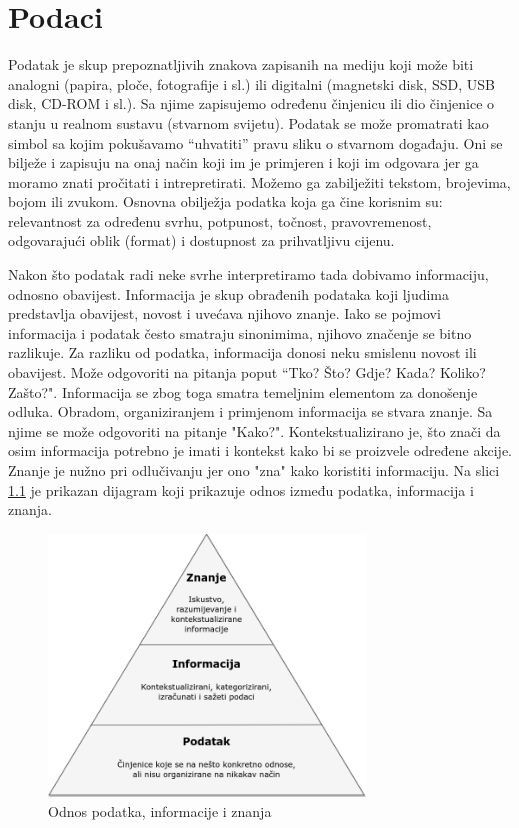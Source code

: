\documentclass{foi}
\begin{document}
\chapter{Podaci}

Podatak je skup prepoznatljivih znakova zapisanih na mediju koji može biti analogni (papira, ploče, fotografije i sl.)  ili digitalni (magnetski disk, SSD, USB disk, CD-ROM i sl.). Sa njime zapisujemo određenu činjenicu ili dio činjenice o stanju u realnom sustavu (stvarnom svijetu). Podatak se može promatrati kao simbol sa kojim pokušavamo “uhvatiti” pravu sliku o stvarnom događaju. Oni se bilježe i zapisuju na onaj način koji im je primjeren i koji im odgovara jer ga moramo znati pročitati i intrepretirati. Možemo ga zabilježiti tekstom, brojevima, bojom ili zvukom. Osnovna obilježja podatka koja ga čine korisnim su: relevantnost za određenu svrhu, potpunost, točnost, pravovremenost, odgovarajući oblik (format) i dostupnost za prihvatljivu cijenu. 

Nakon što podatak radi neke svrhe interpretiramo tada dobivamo informaciju, odnosno obavijest. Informacija je skup obrađenih podataka koji ljudima predstavlja obavijest, novost i uvećava njihovo znanje. Iako se pojmovi informacija i podatak često smatraju sinonimima, njihovo značenje se bitno razlikuje. Za razliku od podatka, informacija donosi neku smislenu novost ili obavijest. Može odgovoriti na pitanja poput “Tko? Što? Gdje? Kada? Koliko? Zašto?". Informacija se zbog toga smatra temeljnim elementom za donošenje odluka. Obradom, organiziranjem i primjenom informacija se stvara znanje. Sa njime se može odgovoriti na pitanje "Kako?". Kontekstualizirano je, što znači da osim informacija potrebno je imati i kontekst kako bi se proizvele određene akcije. Znanje je nužno pri odlučivanju jer ono "zna" kako koristiti informaciju. \cite{poslovnoRacunarstvo} Na slici \ref{znanjeinfopodatak} je prikazan dijagram koji prikazuje odnos između podatka, informacija i znanja.

\begin{figure}[h!]
    \centering
    \includegraphics[width=0.75\textwidth]{slike/znanjeinfopodatak.png}
    \caption{Odnos podatka, informacije i znanja \cite{diwdiagram}}
    \label{znanjeinfopodatak}
\end{figure}
\end{document}
